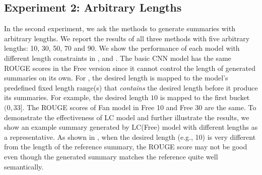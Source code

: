 \subsection{Experiment 2: Arbitrary Lengths}
In the second experiment, we ask the methods to generate
summaries with arbitrary lengths. 
We report the results of all three methods with five arbitrary lengths: 10, 30, 50, 70 and 90.
We show the performance of each model with different
length constraints in ,  and .
The basic CNN model has the same ROUGE scores in the Free version since it cannot control the length of generated 
summaries on its own.
For \cite{abs-1711-05217}, the desired length is mapped to
the model's predefined fixed length range(s) that {\em contains}
the desired length before it produce its summaries. For example,
the desired length $10$ is mapped to the first bucket $(0, 33]$.
The ROUGE scores of Fan model in Free 10 and Free 30 are the same.
To demonstrate the effectiveness of LC model and
 further illustrate the results,
we show an example summary generated by LC(Free) model 
with different lengths as a representative. 
As shown in , when the desired length (e.g., 10) is
very different from the length of the reference summary, the ROUGE score
may not be good even though the generated summary matches the reference
quite well semantically. 

